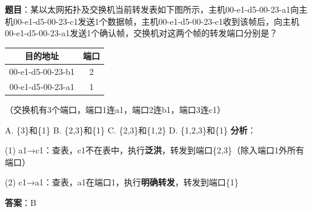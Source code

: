 \begin{examplebox}[例题3.8 2014年真题]
\textbf{题目}：某以太网拓扑及交换机当前转发表如下图所示，主机00-e1-d5-00-23-a1向主机00-e1-d5-00-23-c1发送1个数据帧，主机00-e1-d5-00-23-c1收到该帧后，向主机00-e1-d5-00-23-a1发送1个确认帧，交换机对这两个帧的转发端口分别是？

\begin{center}\small
\begin{tabular}{|c|c|}
\hline
目的地址 & 端口 \\
\hline
00-e1-d5-00-23-b1 & 2 \\
00-e1-d5-00-23-a1 & 1 \\
\hline
\end{tabular}
\end{center}
（交换机有3个端口，端口1连a1，端口2连b1，端口3连c1）

A. \{3\}和\{1\} \quad B. \{2,3\}和\{1\} \quad C. \{2,3\}和\{1,2\} \quad D. \{1,2,3\}和\{1\}
\tcblower
\textbf{分析}：

(1) a1→c1：查表，c1不在表中，执行\textbf{泛洪}，转发到端口\{2,3\}（除入端口1外所有端口）

(2) c1→a1：查表，a1在端口1，执行\textbf{明确转发}，转发到端口\{1\}

\textbf{答案}：B
\end{examplebox}
